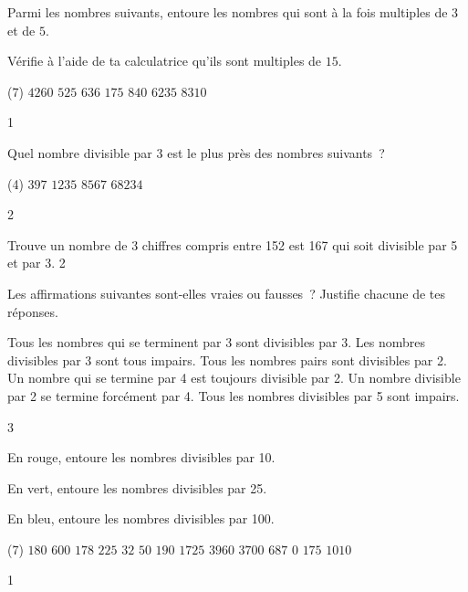 \documentclass[a4paper,11pt]{report}
\begin{document}
\begin{exop}{
    Parmi les nombres suivants, entoure les nombres qui sont à la fois multiples de $3$ et de $5$. 

    Vérifie à l'aide de ta calculatrice qu'ils sont multiples de $15$.

    \begin{tasks}(7)
\task[]   $4260$ 
\task[] $525$ 
\task[] $636$ 
\task[] $175$ 
\task[] $840$ 
\task[] $6235$ 
\task[] $8310$
    \end{tasks}
}{1}\end{exop}






\begin{exo}{
    Quel nombre divisible par 3 est le plus près des nombres suivants~?
    \begin{tasks}(4)
	    \task[] $397$
	    \task[] $1235$
	    \task[] $8567$
	    \task[] $68234$
\end{tasks}
}{2}\end{exo}


\begin{exo}{
    Trouve un nombre de 3 chiffres compris entre 152 est 167 qui soit divisible par 5 et par 3.
}{2}\end{exo}





\begin{exo}{
    Les affirmations suivantes sont-elles vraies ou fausses~? Justifie chacune de tes réponses.

    \begin{tasks}
    \task Tous les nombres qui se terminent par 3 sont divisibles par 3.
    \task Les nombres divisibles par 3 sont tous impairs.
    \task Tous les nombres pairs sont divisibles par 2.
    \task Un nombre qui se termine par 4 est toujours divisible par 2.
    \task Un nombre divisible par 2 se termine forcément par 4.
    \task Tous les nombres divisibles par 5 sont impairs.
    \end{tasks}

}{3}\end{exo}


\begin{exop}{
    En rouge, entoure les nombres divisibles par 10. 

    En vert, entoure les nombres divisibles par 25.

    En bleu, entoure les nombres divisibles par 100.

    \begin{tasks}(7)
\task[] $180$ 
\task[] $600$ 
\task[] $178$ 
\task[] $225$ 
\task[] $32$ 
\task[] $50$ 
\task[] $190$
\task[] $1725$ 
\task[] $3960$ 
\task[] $3700$ 
\task[] $687$ 
\task[] $0$ 
\task[] $175$
\task[] $1010$
    \end{tasks}
}{1}\end{exop}
\end{document}
